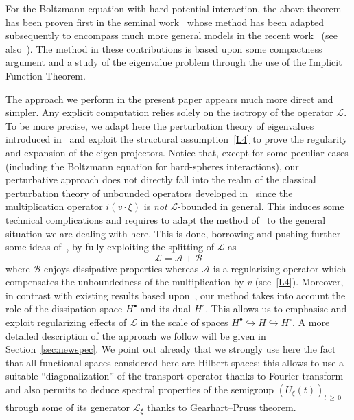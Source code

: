\documentclass[AHL,Unicode,longabstracts,published]{cedram}
\renewcommand{\AA}{\mathcal{A}}
\newcommand{\BB}{\mathcal{B}}
\newcommand{\LL}{\mathcal{L}}
\newcommand{\Ss}{H}
\newcommand{\Ssp}{H^{\bullet}}
\newcommand{\Ssm}{H^{\circ}}
\renewcommand*\ge{\geqslant}
\begin{document}
For the Boltzmann equation with hard potential interaction, the above {theorem} has been proven first in the seminal work~\cite{EP1975} whose method has been {adapted} subsequently to encompass much more general models in the recent work~\cite{YY} (see also~\cite{LY2016, LY2017,YY23}). The method in these contributions is based upon some compactness argument and a study of the eigenvalue problem through the use of the Implicit Function Theorem.

The approach we perform in the present paper appears much more direct and simpler. Any explicit computation relies solely on the isotropy of the operator $\LL$. To be more precise, we adapt here the perturbation theory of eigenvalues introduced in~\cite{K1995} and exploit the structural assumption~\eqref{L4} to prove the regularity and expansion of the eigen-projectors. Notice that, except for some peculiar cases (including the Boltzmann equation for hard-spheres interactions), our perturbative approach does not directly fall into the realm of the classical perturbation theory of unbounded operators developed in~\cite{K1995} since the multiplication operator $i(v\cdot\xi)$ is \emph{not} $\LL$-bounded in general. This induces some technical complications and requires to adapt the method of~\cite{K1995} to the general situation we are dealing with here. This is done, borrowing and pushing further some ideas of~\cite{T2016}, by fully exploiting the splitting of $\LL$ as
\[
\LL=\AA+\BB
\]
where $\BB$ enjoys dissipative properties whereas $\AA$ is a regularizing operator which compensates the unboundedness of the multiplication by $v$ (see~\eqref{L4}). Moreover, in contrast with existing results based upon~\cite{EP1975}, our method takes into account the role of the dissipation space $\Ssp$ and its dual $\Ssm$. This allows us to emphasise and exploit regularizing effects of $\LL$ in the scale of spaces $\Ssp \hookrightarrow \Ss \hookrightarrow \Ssm$. A more detailed description of the approach we follow will be given in Section~\ref{sec:newspec}. We point out already that we strongly use here the fact that all functional spaces considered here are Hilbert spaces: this allows to use a suitable ``diagonalization'' of the transport operator thanks to Fourier transform and also permits to deduce spectral properties of the semigroup $\left(U_{\xi}(t)\right)_{t\,\ge\,0}$ through some of its generator $\LL_{\xi}$ thanks to Gearhart--Pruss theorem.
\end{document}
